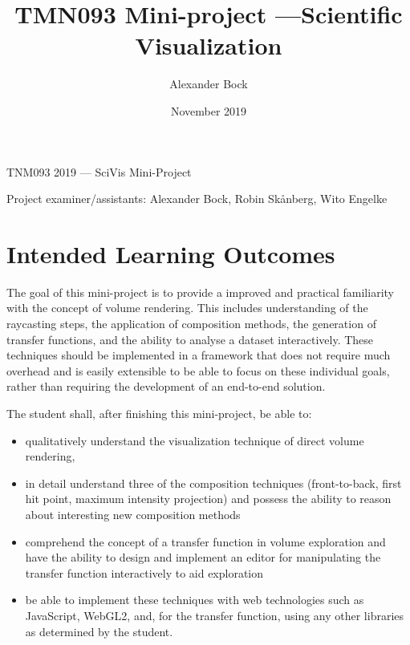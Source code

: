 \documentclass{labinstructions}
\begin{document}
\setcounter{page}{1}

\pagestyle{empty}


%
%
\begin{center}
{\Huge TNM093 2019 --- SciVis Mini-Project}
\vspace{0.6cm}

\Large{Project examiner/assistants: Alexander Bock, Robin Sk\aa nberg, Wito Engelke}
\end{center}

\title{TMN093 Mini-project ---Scientific Visualization}
\author{Alexander Bock}
\date{November 2019}

\pagestyle{fancy}
\fancyfoot[c]{}
\fancyfoot[R]{\thepage}

\section{Intended Learning Outcomes}
The goal of this mini-project is to provide a improved and practical familiarity with the concept of volume rendering.  This includes understanding of the raycasting steps, the application of composition methods, the generation of transfer functions, and the ability to analyse a dataset interactively.  These techniques should be implemented in a framework that does not require much overhead and is easily extensible to be able to focus on these individual goals, rather than requiring the development of an end-to-end solution.

The student shall, after finishing this mini-project, be able to:
\begin{itemize}
  \item qualitatively understand the visualization technique of direct volume rendering,
  \item in detail understand three of the composition techniques (front-to-back, first hit point, maximum intensity projection) and possess the ability to reason about interesting new composition methods
  \item comprehend the concept of a transfer function in volume exploration and have the ability to design and implement an editor for manipulating the transfer function interactively to aid exploration
  \item be able to implement these techniques with web technologies such as JavaScript, WebGL2, and, for the transfer function, using any other libraries as determined by the student.
\end{itemize}{}
\end{document}
